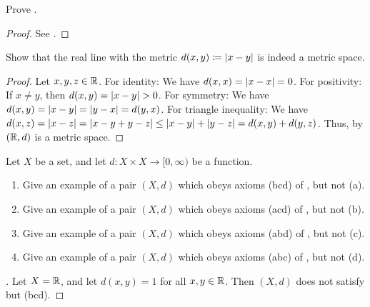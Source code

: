 \exercisesection

\begin{ex}\label{ii:ex:1.1.1}
  Prove .
\end{ex}

\begin{proof}
  See .
\end{proof}

\begin{ex}\label{ii:ex:1.1.2}
  Show that the real line with the metric \(d(x, y) \coloneqq \left\lvert x - y\right\rvert\) is indeed a metric space.
\end{ex}

\begin{proof}
  Let \(x, y, z \in \mathbb{R}\).
  For identity:
  We have \(d(x, x) = \left\lvert x - x\right\rvert = 0\).
  For positivity:
  If \(x \neq y\), then \(d(x, y) = \left\lvert x - y\right\rvert > 0\).
  For symmetry:
  We have \(d(x, y) = \left\lvert x - y\right\rvert = \left\lvert y - x\right\rvert = d(y, x)\).
  For triangle inequality:
  We have \(d(x, z) = \left\lvert x - z\right\rvert = \left\lvert x - y + y - z\right\rvert \leq \left\lvert x - y\right\rvert + \left\lvert y - z\right\rvert = d(x, y) + d(y, z)\).
  Thus, by  \((\mathbb{R}, d)\) is a metric space.
\end{proof}

\begin{ex}\label{ii:ex:1.1.3}
  Let \(X\) be a set, and let \(d : X \times X \to [0, \infty)\) be a function.
  \begin{enumerate}
    \item\label{ii:ex:1.1.3.a} Give an example of a pair \((X, d)\) which obeys axioms (bcd) of , but not (a).
    \item\label{ii:ex:1.1.3.b} Give an example of a pair \((X, d)\) which obeys axioms (acd) of , but not (b).
    \item\label{ii:ex:1.1.3.c} Give an example of a pair \((X, d)\) which obeys axioms (abd) of , but not (c).
    \item\label{ii:ex:1.1.3.d} Give an example of a pair \((X, d)\) which obeys axioms (abc) of , but not (d).
  \end{enumerate}
\end{ex}

\begin{proof}[]
  Let \(X = \mathbb{R}\), and let \(d(x, y) = 1\) for all \(x, y \in \mathbb{R}\).
  Then \((X, d)\) does not satisfy  but (bcd).
\end{proof}

